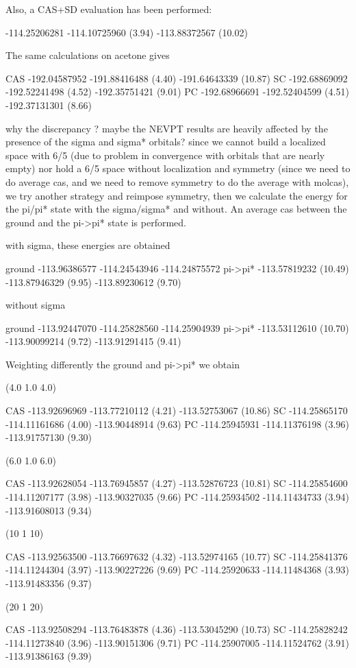 \documentclass[a4paper]{article}
\begin{document}
Also, a CAS+SD evaluation has been performed:

-114.25206281 -114.10725960 (3.94) -113.88372567 (10.02)



The same calculations on acetone gives

CAS   -192.04587952    -191.88416488 (4.40)   -191.64643339 (10.87)
SC    -192.68869092    -192.52241498 (4.52)   -192.35751421 (9.01)
PC    -192.68966691    -192.52404599 (4.51)   -192.37131301 (8.66)


why the discrepancy ? maybe the NEVPT results are heavily affected by the
presence of the sigma and sigma* orbitals?
since we cannot build a localized space with 6/5 (due to problem in
convergence with orbitals that are nearly empty) nor hold a 6/5 space without
localization and symmetry (since we need to do average cas, and we need to
remove symmetry to do the average with molcas), we try another strategy and
reimpose symmetry, then we calculate the energy for the pi/pi* state with the
sigma/sigma* and without. An average cas between the ground and the pi->pi*
state is performed.

 
with sigma, these energies are obtained

ground   -113.96386577           -114.24543946           -114.24875572
pi->pi*  -113.57819232 (10.49)   -113.87946329 (9.95)    -113.89230612 (9.70)

without sigma

ground   -113.92447070           -114.25828560           -114.25904939
pi->pi*  -113.53112610 (10.70)   -113.90099214 (9.72)    -113.91291415 (9.41)


Weighting differently the ground and pi->pi* we obtain

(4.0 1.0 4.0)

CAS  -113.92696969      -113.77210112 (4.21)     -113.52753067 (10.86)
SC   -114.25865170      -114.11161686 (4.00)     -113.90448914 (9.63)
PC   -114.25945931      -114.11376198 (3.96)     -113.91757130 (9.30)

(6.0 1.0 6.0)

CAS  -113.92628054      -113.76945857 (4.27)     -113.52876723 (10.81)
SC   -114.25854600      -114.11207177 (3.98)     -113.90327035 (9.66)
PC   -114.25934502      -114.11434733 (3.94)     -113.91608013 (9.34)

(10 1 10)
 
CAS  -113.92563500      -113.76697632 (4.32)     -113.52974165 (10.77)
SC   -114.25841376      -114.11244304 (3.97)     -113.90227226 (9.69)
PC   -114.25920633      -114.11484368 (3.93)     -113.91483356 (9.37)
 
(20 1 20)

CAS  -113.92508294      -113.76483878 (4.36)     -113.53045290 (10.73)
SC   -114.25828242      -114.11273840 (3.96)     -113.90151306 (9.71)
PC   -114.25907005      -114.11524762 (3.91)     -113.91386163 (9.39)
\end{document}
